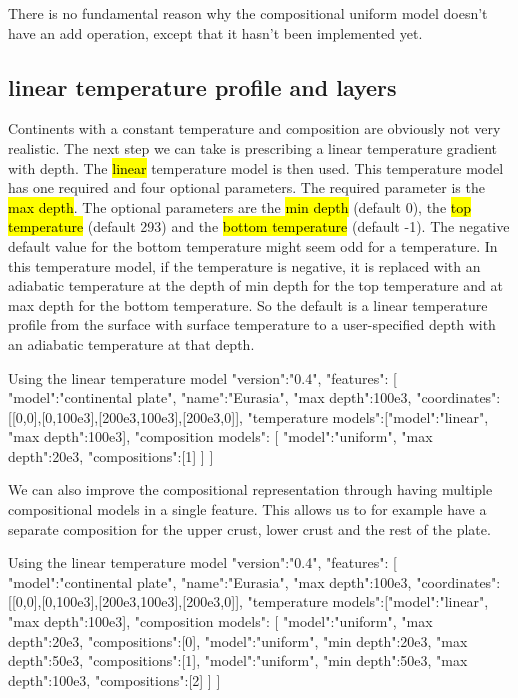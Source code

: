 \documentclass{book}
\begin{document}
\begin{remark}
There is no fundamental reason why the compositional uniform model doesn't have an add operation, except that it hasn't been implemented yet.
\end{remark}

\subsection{linear temperature profile and layers}
Continents with a constant temperature and composition are obviously not very realistic. The next step we can take is prescribing a linear temperature gradient with depth. The \hl{linear} temperature model is then used. This temperature model has one required and four optional parameters. The required parameter is the \hl{max depth}. The optional parameters are the \hl{min depth} (default 0), the \hl{top temperature} (default 293) and the \hl{bottom temperature} (default -1). The negative default value for the bottom temperature might seem odd for a temperature. In this temperature model, if the temperature is negative, it is replaced with an adiabatic temperature at the depth of min depth for the top temperature and at max depth for the bottom temperature. So the default is a linear temperature profile from the surface with surface temperature to a user-specified depth with an adiabatic temperature at that depth.

\begin{javascriptcode}{Using the linear temperature model}{}
{
  "version":"0.4",
  "features":
  [
    {
      "model":"continental plate", "name":"Eurasia", "max depth":100e3,
      "coordinates":[[0,0],[0,100e3],[200e3,100e3],[200e3,0]],
      "temperature models":[{"model":"linear", "max depth":100e3}],
      "composition models":
      [
        {"model":"uniform", "max depth":20e3, "compositions":[1]}
      ]
    }
  ]
}
\end{javascriptcode}

We can also improve the compositional representation through having multiple compositional models in a single feature. This allows us to for example have a separate composition for the upper crust, lower crust and the rest of the plate.

\begin{javascriptcode}{Using the linear temperature model}{}
{
  "version":"0.4",
  "features":
  [
    {
      "model":"continental plate", "name":"Eurasia", "max depth":100e3,
      "coordinates":[[0,0],[0,100e3],[200e3,100e3],[200e3,0]],
      "temperature models":[{"model":"linear", "max depth":100e3}],
      "composition models":
      [
        {"model":"uniform", "max depth":20e3, "compositions":[0]},
        {"model":"uniform", "min depth":20e3, "max depth":50e3, "compositions":[1]},
        {"model":"uniform", "min depth":50e3, "max depth":100e3, "compositions":[2]}
      ]
    }
  ]
}
\end{javascriptcode}
\end{document}
